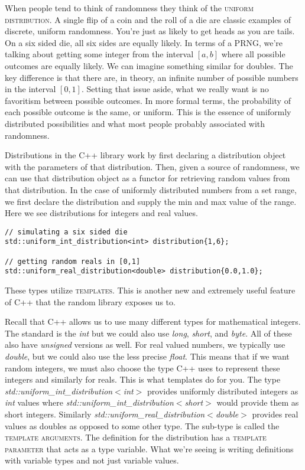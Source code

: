 \documentclass[]{tufte-handout}
\begin{document}
When people tend to think of randomness they think of the \textsc{uniform distribution}. A single flip of a coin and the roll of a die are classic examples of discrete, uniform randomness. You're just as likely to get heads as you are tails. On a six sided die, all six sides are equally likely. In terms of a PRNG, we're talking about getting some integer from the interval $[a,b]$ where all possible outcomes are equally likely. We can imagine something similar for doubles.  The key difference is that there are, in theory, an infinite number of possible numbers in the interval $[0,1]$.  Setting that issue aside, what we really want is no favoritism between possible outcomes. In more formal terms, the probability of each possible outcome is the same, or uniform.  This is the essence of uniformly distributed possibilities and what most people probably associated with randomness.

Distributions in the C++ library work by first declaring a distribution object with the parameters of that distribution. Then, given a source of randomness, we can use that distribution object as a functor for retrieving random values from that distribution. In the case of uniformly distributed numbers from a set range, we first declare the distribution and supply the min and max value of the range. Here we see distributions for integers and real values.
\begin{verbatim}
// simulating a six sided die
std::uniform_int_distribution<int> distribution{1,6};

// getting random reals in [0,1]
std::uniform_real_distribution<double> distribution{0.0,1.0};
\end{verbatim}
These types utilize \textsc{templates}.  This is another new and extremely useful feature of C++ that the random library exposes us to.

Recall that C++ allows us to use many different types for mathematical integers. The standard is the \textit{int} but we could also use \textit{long}, \textit{short}, and \textit{byte}.  All of these also have \textit{unsigned} versions as well. For real valued numbers, we typically use \textit{double}, but we could also use the less precise \textit{float}.  This means that if we want random integers, we must also choose the type C++ uses to represent these integers and similarly for reals. This is what templates do for you. The type \textit{std::uniform\_int\_distribution$<$int$>$} provides uniformly distributed integers as \textit{int} values where \textit{std::uniform\_int\_distribution$<$short$>$} would provide them as short integers. Similarly \textit{std::uniform\_real\_distribution$<$double$>$} provides real values as doubles as opposed to some other type. The sub-type is called the \textsc{template arguments}. The definition for the distribution has a \textsc{template parameter} that acts as a type variable. What we're seeing is writing definitions with variable types and not just variable values.
\end{document}
